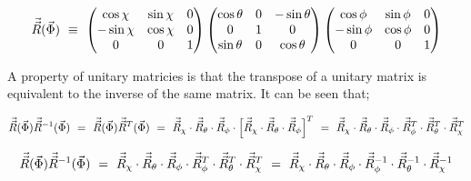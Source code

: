 \documentclass[11pt]{article}
\begin{document}
\begin{equation}
\vec{\vec{R}} ( \vec{\Phi} ) \hspace{0.125cm} \equiv \hspace{0.125cm} 
\begin{pmatrix}
\cos{\chi} & \sin{\chi} & 0 \\
-\sin{\chi} & \cos{\chi} & 0 \\
0 & 0 & 1 
\end{pmatrix}
\begin{pmatrix}
\cos{\theta} & 0 & -\sin{\theta} \\
0 & 1 & 0 \\
\sin{\theta} & 0 & \cos{\theta}
\end{pmatrix}
\begin{pmatrix}
\cos{\phi} & \sin{\phi} & 0 \\
-\sin{\phi} & \cos{\phi} & 0 \\
0 & 0 & 1 
\end{pmatrix}
\end{equation}

A property of unitary matricies is that the transpose of a unitary matrix is equivalent to the inverse of the same matrix. It can be seen that;

\begin{equation}
    \vec{\vec{R}} ( \vec{\Phi} )  \vec{\vec{R}}^{-1} ( \vec{\Phi} ) \hspace{0.125cm} = \hspace{0.125cm}
    \vec{\vec{R}} ( \vec{\Phi} )  \vec{\vec{R}}^{T} ( \vec{\Phi} ) \hspace{0.125cm} = \hspace{0.125cm}  \vec{\vec{R}}_{\chi} \cdot \vec{\vec{R}}_{\theta} \cdot \vec{\vec{R}}_{\phi} \cdot \Big[ \vec{\vec{R}}_{\chi} \cdot \vec{\vec{R}}_{\theta} \cdot \vec{\vec{R}}_{\phi} \Big]^{T} \hspace{0.125cm} = \hspace{0.125cm} \vec{\vec{R}}_{\chi} \cdot \vec{\vec{R}}_{\theta} \cdot \vec{\vec{R}}_{\phi} \cdot \vec{\vec{R}}_{\phi}^{T} \cdot \vec{\vec{R}}_{\theta}^{T} \cdot \vec{\vec{R}}_{\chi}^{T} 
\end{equation}

\begin{equation}
    \vec{\vec{R}} ( \vec{\Phi} )  \vec{\vec{R}}^{-1} ( \vec{\Phi} ) \hspace{0.125cm} = \hspace{0.125cm} \vec{\vec{R}}_{\chi} \cdot \vec{\vec{R}}_{\theta} \cdot \vec{\vec{R}}_{\phi} \cdot
    \vec{\vec{R}}_{\phi}^{T} \cdot \vec{\vec{R}}_{\theta}^{T} \cdot \vec{\vec{R}}_{\chi}^{T} \hspace{0.125cm} = \hspace{0.125cm} \vec{\vec{R}}_{\chi} \cdot \vec{\vec{R}}_{\theta} \cdot \vec{\vec{R}}_{\phi} \cdot \vec{\vec{R}}_{\phi}^{-1} \cdot \vec{\vec{R}}_{\theta}^{-1} \cdot \vec{\vec{R}}_{\chi}^{-1} 
\end{equation}
\end{document}
